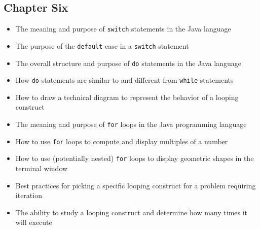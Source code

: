 \documentclass[11pt]{article}
\begin{document}
\begin{itemize}

\end{itemize}

\subsection*{Chapter Six}

\begin{itemize}

  \itemsep 0in

  \item The meaning and purpose of {\tt switch} statements in the Java language
  \item The purpose of the {\tt default} case in a {\tt switch} statement
  \item The overall structure and purpose of {\tt do} statements in the Java language
  \item How {\tt do} statements are similar to and different from {\tt while} statements
  \item How to draw a technical diagram to represent the behavior of a looping construct
  \item The meaning and purpose of {\tt for} loops in the Java programming language
  \item How to use {\tt for} loops to compute and display multiples of a number
  \item How to use (potentially nested) {\tt for} loops to display geometric shapes in the terminal window
  \item Best practices for picking a specific looping construct for a problem requiring iteration
  \item The ability to study a looping construct and determine how many times it will execute

\end{itemize}
\end{document}
